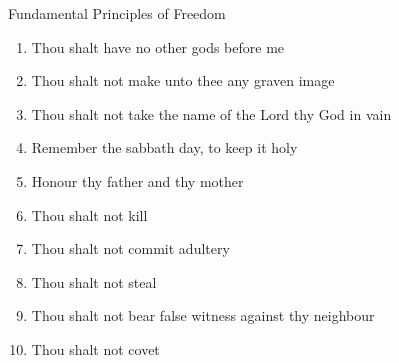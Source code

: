 \begin{frame}{Fundamental Principles of Freedom}
    \begin{enumerate}
        \item Thou shalt have no other gods before me
        \item Thou shalt not make unto thee any graven image
        \item Thou shalt not take the name of the Lord thy God in vain
        \item Remember the sabbath day, to keep it holy
        \item Honour thy father and thy mother
        \item Thou shalt not kill
        \item Thou shalt not commit adultery
        \item Thou shalt not steal
        \item Thou shalt not bear false witness against thy neighbour
        \item Thou shalt not covet
    \end{enumerate}
\end{frame}

